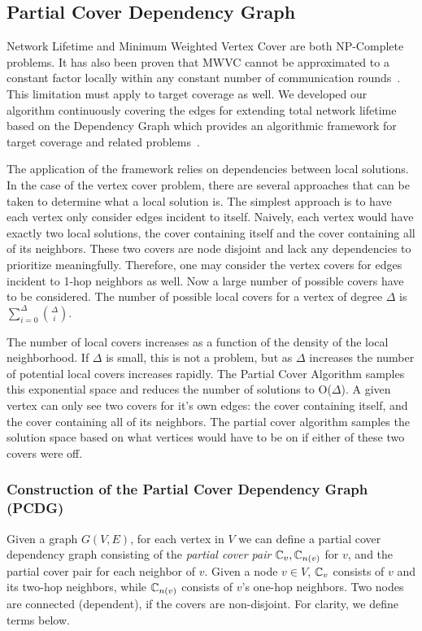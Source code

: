 \documentclass[conference, 10pt]{IEEEtran}
\begin{document}
\subsection{Partial Cover Dependency Graph}
\label{sec:life-depend}
Network Lifetime and Minimum Weighted Vertex Cover are both NP-Complete problems. It has also been proven that MWVC cannot be approximated to a constant factor locally within any constant number of communication rounds~\cite{1011811}. This limitation must apply to target coverage as well. We developed our algorithm continuously covering the edges for extending total network lifetime based on the Dependency Graph which provides an algorithmic framework for target coverage and related problems~\cite{IPDPS.2008.45361}. 

The application of the framework relies on dependencies between local solutions. In the case of the vertex cover problem, there are several approaches that can be taken to determine what a local solution is. The simplest approach is to have each vertex only consider edges incident to itself. Naively, each vertex would have exactly two local solutions, the cover containing itself and the cover containing all of its neighbors. These two covers are node disjoint and lack any dependencies to prioritize meaningfully.   Therefore, one may consider the vertex covers for edges incident to 1-hop neighbors as well. Now a large number of possible covers have to be considered. The number of possible local covers for a vertex of degree $\Delta$ is $\sum_{i=0}^\Delta \binom{\Delta}{i}$. 

\label{sec:PCDG}
The number of local covers increases as a function of the density of the local neighborhood. If $\Delta$ is small, this is not a problem, but as $\Delta$ increases the number of potential local covers increases rapidly. The Partial Cover Algorithm samples this exponential space and reduces the number of solutions to O($\Delta$). A given vertex can only see two covers for it's own edges: the cover containing itself, and the cover containing all of its neighbors. The partial cover algorithm samples the solution space based on what vertices would have to be on if either of these two covers were off. 

\subsubsection{Construction of the  Partial Cover Dependency Graph (PCDG)}

Given a graph $G(V,E)$, for each vertex in $V$ we can define a partial cover dependency graph consisting of the {\em partial cover pair} ${\mathbb C}_v, {\mathbb C}_{n(v)}$ for $v$, and the partial cover pair for each neighbor of $v$. Given a node $v \in V$, ${\mathbb C}_v$ consists of $v$ and its two-hop neighbors, while ${\mathbb C}_{n(v)}$ consists of $v$'s one-hop neighbors. Two nodes are connected (dependent), if the covers are non-disjoint. For clarity, we define terms below.
\end{document}
